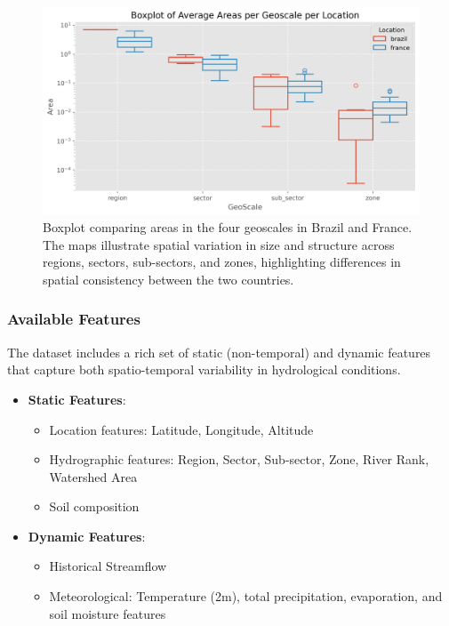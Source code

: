 \documentclass[ruler]{CUP-JNL-EDS}%
\begin{document}
\begin{figure}[htbp]
    \includegraphics[width=1.0\textwidth]{./assets/images/Boxplot of Average Areas per Geoscale per Location.png}
    \caption{Boxplot comparing areas in the four geoscales in Brazil and France. The maps illustrate spatial variation in size and structure across regions, sectors, sub-sectors, and zones, highlighting differences in spatial consistency between the two countries.}
    \label{fig:geoscale_averages_per_location}
\end{figure} 

\subsubsection{Available Features}
The dataset includes a rich set of static (non-temporal) and dynamic features that capture both spatio-temporal variability in hydrological conditions.
\begin{itemize}
    \item \textbf{Static Features}: 
    \begin{itemize}
        \item Location features: Latitude, Longitude, Altitude  
        \item Hydrographic features: Region, Sector, Sub-sector, Zone, River Rank, Watershed Area  
        \item Soil composition
    \end{itemize}
    \item \textbf{Dynamic Features}: 
    \begin{itemize}
        \item Historical Streamflow
        \item Meteorological: Temperature (2m), total precipitation, evaporation, and soil moisture features 
    \end{itemize}
\end{itemize}
\end{document}
